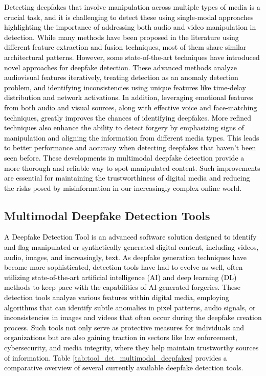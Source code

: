 \textcolor{black}{Detecting deepfakes that involve manipulation across multiple types of media is a crucial task, and it is challenging to detect these using single-modal approaches highlighting the importance of addressing both audio and video manipulation in detection. While many methods have been proposed in the literature using different feature extraction and fusion techniques, most of them share similar architectural patterns. However, some state-of-the-art techniques have introduced novel approaches for deepfake detection. These advanced methods analyze audiovisual features iteratively, treating detection as an anomaly detection problem, and identifying inconsistencies using unique features like time-delay distribution and network activations. In addition, leveraging emotional features from both audio and visual sources, along with effective voice and face-matching techniques, greatly improves the chances of identifying deepfakes. More refined techniques also enhance the ability to detect forgery by emphasizing signs of manipulation and aligning the information from different media types. This leads to better performance and accuracy when detecting deepfakes that haven't been seen before. These developments in multimodal deepfake detection provide a more thorough and reliable way to spot manipulated content. Such improvements are essential for maintaining the trustworthiness of digital media and reducing the risks posed by misinformation in our increasingly complex online world.}

\subsection{Multimodal Deepfake Detection Tools}

\textcolor{black}{A Deepfake Detection Tool is an advanced software solution designed to identify and flag manipulated or synthetically generated digital content, including videos, audio, images, and increasingly, text. As deepfake generation techniques have become more sophisticated, detection tools have had to evolve as well, often utilizing state-of-the-art artificial intelligence (AI) and deep learning (DL) methods to keep pace with the capabilities of AI-generated forgeries. These detection tools analyze various features within digital media, employing algorithms that can identify subtle anomalies in pixel patterns, audio signals, or inconsistencies in images and videos that often occur during the deepfake creation process. Such tools not only serve as protective measures for individuals and organizations but are also gaining traction in sectors like law enforcement, cybersecurity, and media integrity, where they help maintain trustworthy sources of information. Table \ref{tab:tool_det_multimodal_deepfakes} provides a comparative overview of several currently available deepfake detection tools.}

